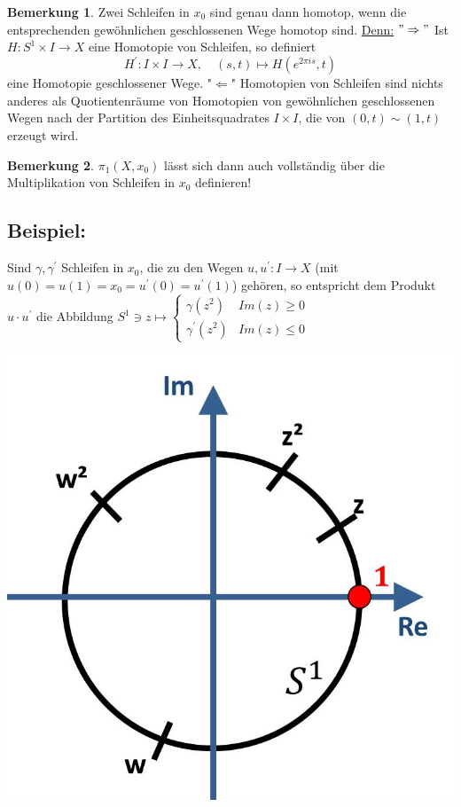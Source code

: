 \documentclass[a4paper,11pt,notitlepage]{report}
\theoremstyle{definition}
\newtheorem{remark}{Bemerkung}[chapter]
\newenvironment{bsp}[1]
{
\setlength{\fboxsep}{10pt}
\subsection*{Beispiel: #1}
\begin{upshape}
}
{
\end{upshape}
}
\begin{document}
\begin{remark}{}
	Zwei Schleifen in $x_0$ sind genau dann homotop, wenn die entsprechenden gewöhnlichen geschlossenen Wege homotop sind.
	\newline
	\underline{Denn:} $"\Rightarrow"$ Ist $H \colon S^1 \times I \rightarrow X$ eine Homotopie von Schleifen, so definiert 
	$$H^\prime \colon I \times I \rightarrow X,\quad (s,t) \mapsto H(e^{2 \pi i s}, t)$$
	eine Homotopie geschlossener Wege.
	\newline
	"$\Leftarrow$" Homotopien von Schleifen sind nichts anderes als Quotientenräume von Homotopien von gewöhnlichen geschlossenen Wegen nach der Partition des Einheitsquadrates $I \times I$, die von $(0,t) \sim (1,t)$ erzeugt wird.
\end{remark}

\begin{remark}{}
	$\pi_1(X,x_0)$ lässt sich dann auch vollständig über die Multiplikation von Schleifen in $x_0$ definieren!
\end{remark}

\begin{bsp}{}
	Sind $\gamma, \gamma^\prime$ Schleifen in $x_0$, die zu den Wegen $u,u^\prime \colon I \rightarrow X$ (mit $u(0)=u(1)=x_0=u^\prime(0)=u^\prime(1)$) gehören, so entspricht dem Produkt $u \cdot u^\prime$ die Abbildung $S^1 \ni z \mapsto \begin{cases} \gamma(z^2) & Im(z) \geq 0 \\ \gamma^\prime(z^2) & Im(z) \leq 0 \end{cases}$
	\begin{center}
	\includegraphics[scale=0.3]{images/Produkt_auf_S1.jpg}
	\end{center}
\end{bsp}
\end{document}
